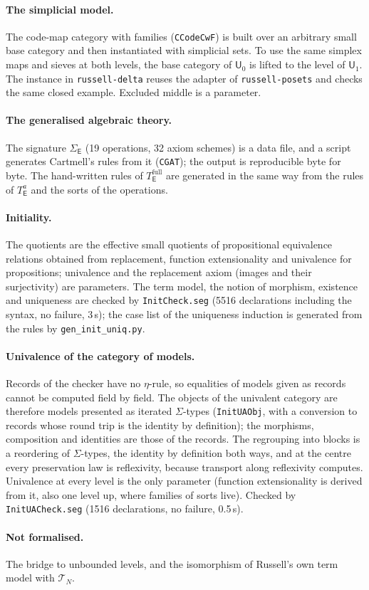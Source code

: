 \documentclass[11pt]{article}
\theoremstyle{definition}
\theoremstyle{remark}
\newcommand{\U}{\mathsf U}
\newcommand{\seg}[1]{\texttt{#1}}
\begin{document}
\paragraph{The simplicial model.} The code-map category with families
(\seg{CCodeCwF}) is built over an arbitrary small base category and then
instantiated with simplicial sets. To use the same simplex maps and sieves
at both levels, the base category of $\U_0$ is lifted to the level of
$\U_1$. The instance in \seg{russell-delta} reuses the adapter of
\seg{russell-posets} and checks the same closed example. Excluded middle
is a parameter.

\paragraph{The generalised algebraic theory.} The signature
$\Sigma_{\mathsf E}$ (19 operations, 32 axiom schemes) is a data file, and
a script generates Cartmell's rules from it (\seg{CGAT}); the output is
reproducible byte for byte. The hand-written rules of
$T_{\mathsf E}^{\mathrm{full}}$ are generated in the same way from the
rules of $T_{\mathsf E}^{a}$ and the sorts of the operations.

\paragraph{Initiality.} The quotients are the effective small quotients
of propositional equivalence relations obtained from replacement, function
extensionality and univalence for propositions; univalence and the
replacement axiom (images and their surjectivity) are parameters. The term
model, the notion of morphism, existence and uniqueness are checked by
\seg{InitCheck.seg} (5516 declarations including the syntax, no failure,
3\,s); the case list of the uniqueness induction is generated from the
rules by \seg{gen\_init\_uniq.py}.

\paragraph{Univalence of the category of models.} Records of the checker
have no $\eta$-rule, so equalities of models given as records cannot be
computed field by field. The objects of the univalent category are
therefore models presented as iterated $\Sigma$-types (\seg{InitUAObj},
with a conversion to records whose round trip is the identity by
definition); the morphisms, composition and identities are those of the
records. The regrouping into blocks is a reordering of $\Sigma$-types, the
identity by definition both ways, and at the centre every preservation law
is reflexivity, because transport along reflexivity computes. Univalence at
every level is the only parameter (function extensionality is derived from
it, also one level up, where families of sorts live). Checked by
\seg{InitUACheck.seg} (1516 declarations, no failure, 0.5\,s).

\paragraph{Not formalised.} The bridge to unbounded levels, and the
isomorphism of Russell's own term model with $\mathcal T_N$.
\end{document}
